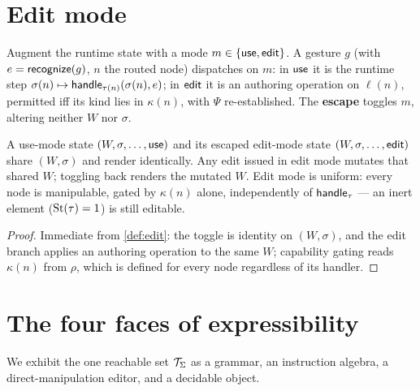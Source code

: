 \documentclass[../uxoxo-main]{subfiles}
\begin{document}
\section{Edit mode}\label{sec:edit}
\begin{definition}\label{def:edit}
Augment the runtime state with a mode $m\in\{\mathsf{use},\mathsf{edit}\}$. A gesture $g$
(with $e=\mathsf{recognize}(g)$, $n$ the routed node) dispatches on $m$: in $\mathsf{use}$ it
is the runtime step $\sigma(n)\mapsto\mathsf{handle}_{\tau(n)}(\sigma(n),e)$; in
$\mathsf{edit}$ it is an authoring operation on $\ell(n)$, permitted iff its kind
lies in $\kappa(n)$, with $\Psi$ re-established. The \textbf{escape} toggles $m$,
altering neither $W$ nor $\sigma$.
\end{definition}

\begin{proposition}\label{prop:carry}
A use-mode state $(W,\sigma,\dots,\mathsf{use})$ and its escaped edit-mode state
$(W,\sigma,\dots,\mathsf{edit})$ share $(W,\sigma)$ and render identically. Any edit
issued in edit mode mutates that shared $W$; toggling back renders the mutated
$W$. Edit mode is uniform: every node is manipulable, gated by $\kappa(n)$ alone,
independently of $\mathsf{handle}_\tau$ --- an inert element ($\mathrm{St}(\tau)=1$) is still
editable.
\end{proposition}

\begin{proof}
Immediate from \cref{def:edit}: the toggle is identity on $(W,\sigma)$, and the
edit branch applies an authoring operation to the same $W$; capability gating
reads $\kappa(n)$ from $\rho$, which is defined for every node regardless of its
handler.
\end{proof}

\section{The four faces of expressibility}\label{sec:faces}
We exhibit the one reachable set $\mathcal{T}_\Sigma$ as a grammar, an instruction
algebra, a direct-manipulation editor, and a decidable object.
\end{document}
